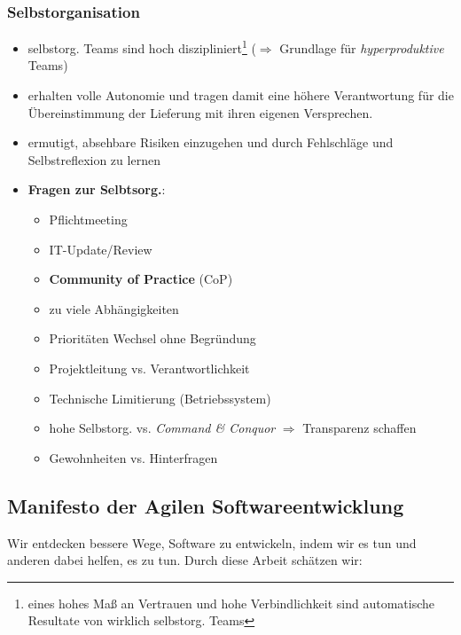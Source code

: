 \subsubsection{Selbstorganisation}
\begin{itemize}
  \item selbstorg. Teams sind hoch diszipliniert\footnote{eines hohes Maß an Vertrauen und hohe
      Verbindlichkeit sind automatische Resultate von wirklich selbstorg. Teams } ($\Rightarrow$ Grundlage für \textit{hyperproduktive} Teams)
  \item erhalten volle Autonomie und tragen damit eine höhere Verantwortung für die
    Übereinstimmung der Lieferung mit ihren eigenen Versprechen.
  \item ermutigt, absehbare Risiken einzugehen und durch Fehlschläge und
    Selbstreflexion zu lernen
  \item \textbf{Fragen zur Selbtsorg.}:
    \begin{itemize}
      \item Pflichtmeeting
      \item IT-Update/Review
      \item \textbf{Community of Practice} (CoP)
      \item zu viele Abhängigkeiten
      \item Prioritäten Wechsel ohne Begründung
      \item Projektleitung vs. Verantwortlichkeit
      \item Technische Limitierung (Betriebssystem)
      \item hohe Selbstorg. vs. \textit{Command \& Conquor} $\Rightarrow$ Transparenz schaffen
    \item Gewohnheiten vs. Hinterfragen
    \end{itemize}
\end{itemize}


\subsection{Manifesto der Agilen Softwareentwicklung}
Wir entdecken bessere Wege, Software zu entwickeln, indem wir es tun und anderen dabei helfen, es zu tun. Durch diese Arbeit schätzen wir:


